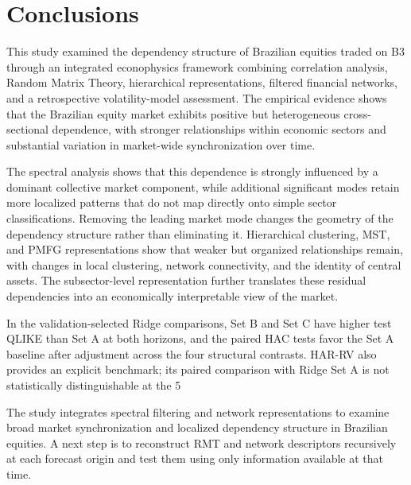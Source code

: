 \section{Conclusions}
\label{sec:conclusion}

This study examined the dependency structure of Brazilian equities traded on B3 through an integrated econophysics framework combining correlation analysis, Random Matrix Theory, hierarchical representations, filtered financial networks, and a retrospective volatility-model assessment. The empirical evidence shows that the Brazilian equity market exhibits positive but heterogeneous cross-sectional dependence, with stronger relationships within economic sectors and substantial variation in market-wide synchronization over time.

The spectral analysis shows that this dependence is strongly influenced by a dominant collective market component, while additional significant modes retain more localized patterns that do not map directly onto simple sector classifications. Removing the leading market mode changes the geometry of the dependency structure rather than eliminating it. Hierarchical clustering, MST, and PMFG representations show that weaker but organized relationships remain, with changes in local clustering, network connectivity, and the identity of central assets. The subsector-level representation further translates these residual dependencies into an economically interpretable view of the market.

In the validation-selected Ridge comparisons, Set B and Set C have higher test QLIKE than Set A at both horizons, and the paired HAC tests favor the Set A baseline after adjustment across the four structural contrasts. HAR-RV also provides an explicit benchmark; its paired comparison with Ridge Set A is not statistically distinguishable at the 5%

The study integrates spectral filtering and network representations to examine broad market synchronization and localized dependency structure in Brazilian equities. A next step is to reconstruct RMT and network descriptors recursively at each forecast origin and test them using only information available at that time.

